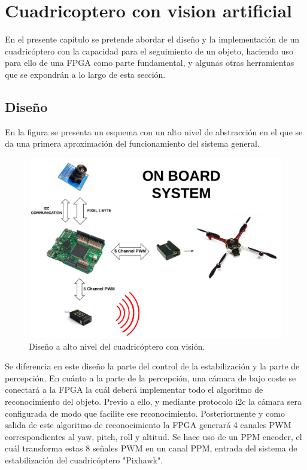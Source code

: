 \chapter{Cuadricoptero con vision artificial}\label{sec: Cuadricoptero}
En el presente capítulo se pretende abordar el diseño y la implementación de un cuadricóptero con la capacidad para el seguimiento de un objeto, haciendo uso para ello de una FPGA como parte fundamental, y algunas otras herramientas que se expondrán a lo largo de esta sección. \newline

\section{Diseño}
En la figura se presenta un esquema con un alto nivel de abstracción en el que se da una primera aproximación del funcionamiento del sistema general.

\begin{figure}[H]
	\center
	\includegraphics[trim = 0mm 0.5cm 0mm 0.5cm, clip,scale=0.4]{imagenes/Cuadricoptero_vision/on_board.pdf}
	\caption{Diseño a alto nivel del cuadricóptero con visión.}
	\label{fig:on_board}
\end{figure}

Se diferencia en este diseño la parte del control de la estabilización y la parte de percepción. 
En cuánto a la parte de la percepción, una cámara de bajo coste se conectará a la FPGA la cuál deberá implementar todo el algoritmo de reconocimiento del objeto. Previo a ello, y mediante protocolo i2c la cámara sera configurada de modo que facilite ese reconocimiento. Posteriormente y como salida de este algoritmo de reconocimiento la FPGA generará 4 canales PWM correspondientes al yaw, pitch, roll y altitud. Se hace uso de un PPM encoder, el cuál transforma estas 8 señales PWM en un canal PPM, entrada del sistema de estabilización del cuadricóptero "Pixhawk".

